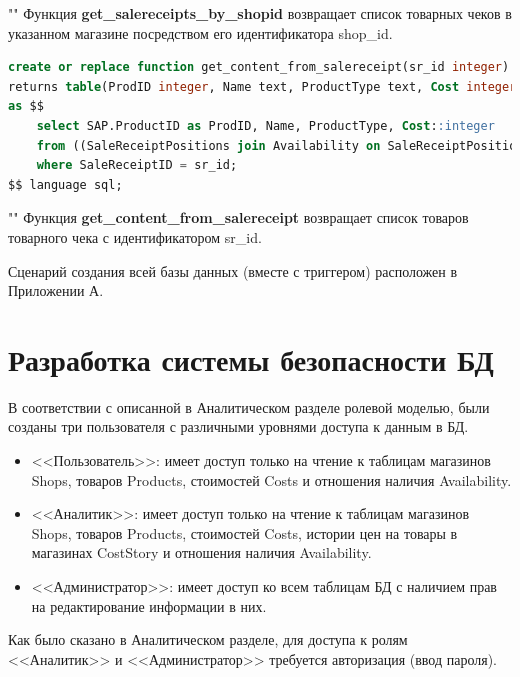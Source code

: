 \documentclass[a4paper,14pt]{extreport}
\begin{document}
""\newline\indent
Функция \textbf{get\_salereceipts\_by\_shopid} возвращает список товарных чеков в указанном магазине посредством его идентификатора shop\_id. 
\newpage
\begin{lstlisting}[language=sql, caption={Реализация хранимой функции get\_content\_from\_salereceipt}]
create or replace function get_content_from_salereceipt(sr_id integer)
returns table(ProdID integer, Name text, ProductType text, Cost integer)
as $$
	select SAP.ProductID as ProdID, Name, ProductType, Cost::integer
	from ((SaleReceiptPositions join Availability on SaleReceiptPositions.AvailabilityID = Availability.ID) as SA join Products on Products.ID = SA.ProductID) as SAP join Costs on SAP.AvailabilityID = Costs.AvailabilityID
	where SaleReceiptID = sr_id;
$$ language sql;
\end{lstlisting}

""\newline\indent
Функция \textbf{get\_content\_from\_salereceipt} возвращает список товаров товарного чека с идентификатором sr\_id. 

Сценарий создания всей базы данных (вместе с триггером) расположен в Приложении А.

\section{Разработка системы безопасности БД}

В соответствии с описанной в Аналитическом разделе ролевой моделью, были созданы три пользователя с различными уровнями доступа к данным в БД.

\begin{itemize}
	\item <<Пользователь>>: имеет доступ только на чтение к таблицам магазинов Shops, товаров Products, стоимостей Costs и отношения наличия Availability.
	\item <<Аналитик>>: имеет доступ только на чтение к таблицам магазинов Shops, товаров Products, стоимостей Costs, истории цен на товары в магазинах CostStory и отношения наличия Availability.
	\item <<Администратор>>: имеет доступ ко всем таблицам БД с наличием прав на редактирование информации в них.
\end{itemize}

Как было сказано в Аналитическом разделе, для доступа к ролям <<Аналитик>> и <<Администратор>> требуется авторизация (ввод пароля).
\end{document}
